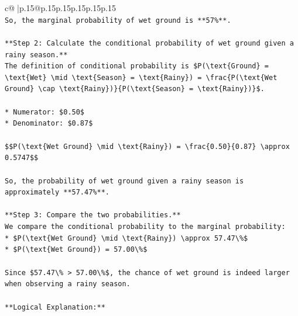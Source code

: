 \documentclass{article}
\begin{document}
{\begin{supertabular}{c@{$\;$}|p{.15\linewidth}@{}p{.15\linewidth}p{.15\linewidth}p{.15\linewidth}p{.15\linewidth}p{.15\linewidth}}
{{{\\ 
\texttt{So, the marginal probability of wet ground is **57\%**.} \\
\\ 
\texttt{**Step 2: Calculate the conditional probability of wet ground given a rainy season.**} \\
\texttt{The definition of conditional probability is \$P(\textbackslash{}text\{Ground\} = \textbackslash{}text\{Wet\} \textbackslash{}mid \textbackslash{}text\{Season\} = \textbackslash{}text\{Rainy\}) = \textbackslash{}frac\{P(\textbackslash{}text\{Wet Ground\} \textbackslash{}cap \textbackslash{}text\{Rainy\})\}\{P(\textbackslash{}text\{Season\} = \textbackslash{}text\{Rainy\})\}\$.} \\
\\ 
\texttt{*   Numerator: \$0.50\$} \\
\texttt{*   Denominator: \$0.87\$} \\
\\ 
\texttt{\$\$P(\textbackslash{}text\{Wet Ground\} \textbackslash{}mid \textbackslash{}text\{Rainy\}) = \textbackslash{}frac\{0.50\}\{0.87\} \textbackslash{}approx 0.5747\$\$} \\
\\ 
\texttt{So, the probability of wet ground given a rainy season is approximately **57.47\%**.} \\
\\ 
\texttt{**Step 3: Compare the two probabilities.**} \\
\texttt{We compare the conditional probability to the marginal probability:} \\
\texttt{*   \$P(\textbackslash{}text\{Wet Ground\} \textbackslash{}mid \textbackslash{}text\{Rainy\}) \textbackslash{}approx 57.47\textbackslash{}\%\$} \\
\texttt{*   \$P(\textbackslash{}text\{Wet Ground\}) = 57.00\textbackslash{}\%\$} \\
\\ 
\texttt{Since \$57.47\textbackslash{}\% > 57.00\textbackslash{}\%\$, the chance of wet ground is indeed larger when observing a rainy season.} \\
\\ 
\texttt{**Logical Explanation:**} \\
}}}
\end{supertabular}}
\end{document}
